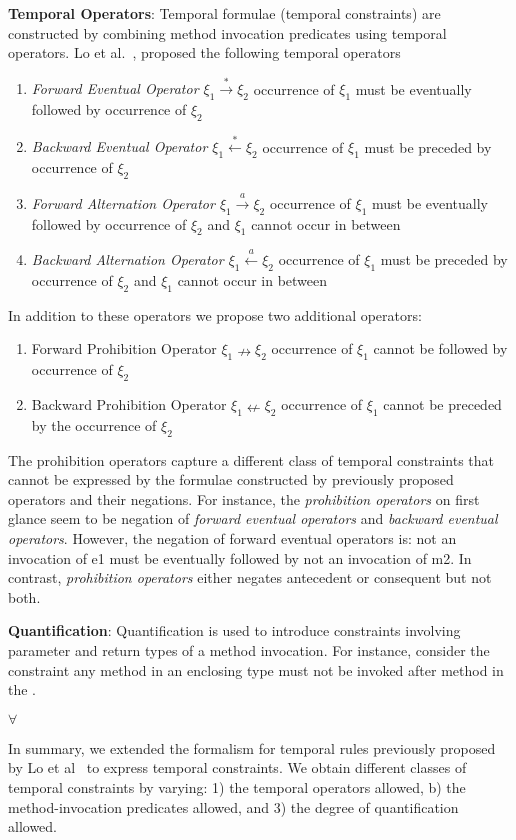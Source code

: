\textbf{Temporal Operators}: Temporal formulae (temporal constraints) are constructed by combining method invocation predicates using temporal operators. Lo et al.~\cite{lo2009mining}, proposed the following temporal operators    

\begin{enumerate}

\item \textit{Forward Eventual Operator $\xi_1 \xrightarrow{*} \xi_2$}
occurrence of $\xi_1$ must be eventually followed by occurrence of $\xi_2$

\item \textit{Backward Eventual Operator $\xi_1 \xleftarrow{*} \xi_2$}
occurrence of $\xi_1$ must be preceded by occurrence of $\xi_2$

\item \textit{Forward Alternation Operator $\xi_1 \xrightarrow{a} \xi_2$}
occurrence of $\xi_1$ must be eventually followed by occurrence of $\xi_2$ and $\xi_1$ cannot occur in between

\item \textit{Backward Alternation Operator $\xi_1 \xleftarrow{a} \xi_2$}
occurrence of $\xi_1$ must be preceded by occurrence of $\xi_2$ and $\xi_1$ cannot occur in between
\end{enumerate}

In addition to these operators we propose two additional operators:
\begin{enumerate}
\item Forward Prohibition Operator $\xi_1 \nrightarrow \xi_2$
occurrence of $\xi_1$ cannot be followed by occurrence of $\xi_2$

\item Backward Prohibition Operator $\xi_1 \nleftarrow \xi_2$
occurrence of $\xi_1$ cannot be preceded by the occurrence of $\xi_2$
\end{enumerate}

The prohibition operators capture a different class of temporal constraints that cannot be expressed by the formulae constructed by previously proposed operators and their negations. For instance, the \textit{prohibition operators} on first glance seem to be negation of \textit{forward eventual operators} and \textit{backward eventual operators}. However, the negation of forward eventual operators is: not an invocation of e1 must be eventually followed by not an invocation of m2. In contrast, \textit{prohibition operators} either negates antecedent or consequent but not both.  

\textbf{Quantification}: Quantification is used to introduce constraints involving parameter and return types of a method invocation. For instance, consider the constraint any method in an enclosing type  must not be invoked after method  in the .

$\forall$ 

In summary, we extended the formalism for temporal rules previously proposed by Lo et al~\cite{lo2009mining} to express temporal constraints.
We obtain different classes of temporal constraints by varying: 1) the temporal operators allowed, b) the method-invocation predicates allowed, and 3) the degree of quantification allowed.